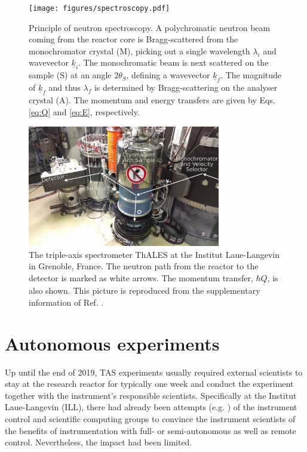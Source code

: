 \begin{figure}[htb]
	\centering
	\texttt{[image: figures/spectroscopy.pdf]}
	\caption[Neutron spectroscopy.]{
		Principle of neutron spectroscopy. A polychromatic neutron beam coming from the reactor core is Bragg-scattered from the monochromator crystal (M), picking out a single wavelength $\lambda_i$ and wavevector $\underline{k}_i$. The monochromatic beam is next scattered on the sample (S) at an angle $2\theta_S$, defining a wavevector $\underline{k}_f$. The magnitude of $\underline{k}_f$ and thus $\lambda_f$ is determined by Bragg-scattering on the analyser crystal (A). The momentum and energy transfers are given by Eqs. \ref{eq:Q} and \ref{eq:E}, respectively. }
	\label{fig:spectroscopy}
\end{figure}

\begin{figure}[htb]
	\centering
	\includegraphics[width=0.75\textwidth]{figures/thales.jpg}
	\caption[The Thales instrument at the ILL.]{
		The triple-axis spectrometer ThALES \cite{thales} at the Institut Laue-Langevin in Grenoble, France. The neutron path from the reactor to the detector is marked as white arrows. The momentum transfer, $\hbar \underline{Q}$, is also shown. This picture is reproduced from the supplementary information of Ref. \cite{skxpaper}.}
	\label{fig:thales}
\end{figure}



\section{Autonomous experiments \label{sec:autonomous}}

Up until the end of 2019, TAS experiments usually required external scientists to stay at the research reactor for typically one week and conduct the experiment together with the instrument's responsible scientists. Specifically at the Institut Laue-Langevin (ILL), there had already been attempts (e.g. \cite{Song2020}) of the instrument control and scientific computing groups to convince the instrument scientists of the benefits of instrumentation with full- or semi-autonomous as well as remote control. Nevertheless, the impact had been limited.

